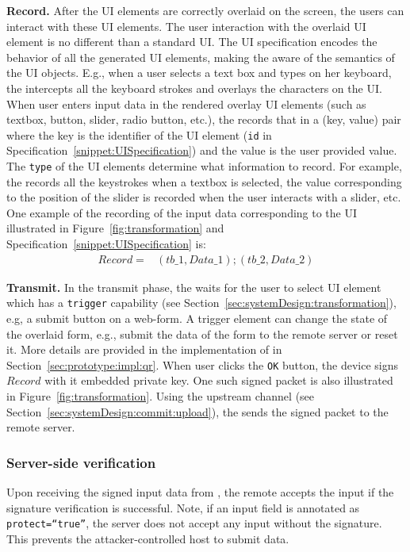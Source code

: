 \begin{mylist}
\item \textbf{Record.} After the UI elements are correctly overlaid on the screen, the users can interact with these UI elements. The user interaction with the overlaid UI element is no different than a standard UI. The UI specification encodes the behavior of all the generated UI elements, making the \device aware of the semantics of the UI objects. E.g., when a user selects a text box and types on her keyboard, the \device intercepts all the keyboard strokes and overlays the characters on the UI.
When user enters input data in the rendered overlay UI elements (such as textbox, button, slider, radio button, etc.), the \device records that in a (key, value) pair where the key is the identifier of the UI element (\texttt{id} in Specification~\ref{snippet:UISpecification}) and the value is the user provided value. The \texttt{type} of the UI elements determine what information to record. For example, the \device records all the keystrokes when a textbox is selected, the value corresponding to the position of the slider is recorded when the user interacts with a slider, etc. One example of the recording of the input data corresponding to the UI illustrated in Figure~\ref{fig:transformation} and Specification~\ref{snippet:UISpecification} is: 
\begin{align*}
Record = & (tb\_1, Data\_1);(tb\_2,Data\_2)
\end{align*}

\item \textbf{Transmit.} In the transmit phase, the \device waits for the user to select UI element which has a \texttt{trigger} capability (see Section~\ref{sec:systemDesign:transformation}), e.g, a submit button on a web-form. A trigger element can change the state of the overlaid form, e.g., submit the data of the form to the remote server or reset it. More details are provided in the implementation of \name in Section~\ref{sec:prototype:impl:qr}. When user clicks the \texttt{OK} button, the device signs $Record$ with it embedded private key. One such signed packet is also illustrated in Figure~\ref{fig:transformation}. Using the upstream channel (see Section~\ref{sec:systemDesign:commit:upload}), the \device sends the signed packet to the remote server.
\end{mylist} 

\subsubsection{\bfseries Server-side verification} \label{sec:systemDesign:commit:verification}Upon receiving the signed input data from \device, the remote accepts the input if the signature verification is successful. Note, if an input field is annotated as \texttt{protect=``true''}, the server does not accept any input without the \device signature. This prevents the attacker-controlled host to submit data. 

